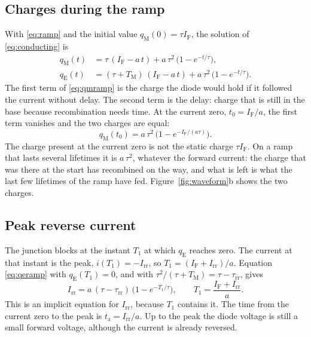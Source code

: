\documentclass[10pt,a4paper]{scrartcl}
\newcommand{\IF}{I_\mathrm{F}}
\newcommand{\Irr}{I_\mathrm{rr}}
\newcommand{\ta}{t_\mathrm{a}}
\newcommand{\taurr}{\tau_\mathrm{rr}}
\newcommand{\TM}{T_\mathrm{M}}
\newcommand{\Tone}{T_1}
\newcommand{\qE}{q_\mathrm{E}}
\newcommand{\qM}{q_\mathrm{M}}
\begin{document}
\subsection{Charges during the ramp}
With \eqref{eq:ramp} and the initial value $\qM(0) = \tau\IF$, the solution of \eqref{eq:conducting} is
\begin{align}
\qM(t) &= \tau\,(\IF - a\,t) + a\,\tau^2\,\bigl(1 - e^{-t/\tau}\bigr) , \label{eq:qmramp}\\
\qE(t) &= (\tau+\TM)\,(\IF - a\,t) + a\,\tau^2\,\bigl(1 - e^{-t/\tau}\bigr) . \label{eq:qeramp}
\end{align}
The first term of \eqref{eq:qmramp} is the charge the diode would hold if it followed the current without delay. The second term is the delay: charge that is still in the base because recombination needs time. At the current zero, $t_0 = \IF/a$, the first term vanishes and the two charges are equal:
\begin{equation}
\qM(t_0) = a\,\tau^2\,\bigl(1 - e^{-\IF/(a\tau)}\bigr) .
\label{eq:qzero}
\end{equation}
The charge present at the current zero is not the static charge $\tau\IF$. On a ramp that lasts several lifetimes it is $a\,\tau^2$, whatever the forward current: the charge that was there at the start has recombined on the way, and what is left is what the last few lifetimes of the ramp have fed. Figure~\ref{fig:waveform}b shows the two charges.

\subsection{Peak reverse current}
The junction blocks at the instant $\Tone$ at which $\qE$ reaches zero. The current at that instant is the peak, $i(\Tone) = -\Irr$, so $\Tone = (\IF+\Irr)/a$. Equation \eqref{eq:qeramp} with $\qE(\Tone) = 0$, and with $\tau^2/(\tau+\TM) = \tau - \taurr$, gives
\begin{equation}
\Irr = a\,(\tau-\taurr)\,\bigl(1 - e^{-\Tone/\tau}\bigr) , \qquad \Tone = \frac{\IF+\Irr}{a} .
\label{eq:peak}
\end{equation}
This is an implicit equation for $\Irr$, because $\Tone$ contains it. The time from the current zero to the peak is $\ta = \Irr/a$. Up to the peak the diode voltage is still a small forward voltage, although the current is already reversed.
\end{document}
